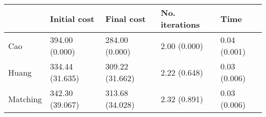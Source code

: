 \begin{tabular}{lllll}
\toprule
{} &     Initial cost &       Final cost & No. iterations &          Time \\
\midrule
Cao      &   394.00 (0.000) &   284.00 (0.000) &   2.00 (0.000) &  0.04 (0.001) \\
Huang    &  334.44 (31.635) &  309.22 (31.662) &   2.22 (0.648) &  0.03 (0.006) \\
Matching &  342.30 (39.067) &  313.68 (34.028) &   2.32 (0.891) &  0.03 (0.006) \\
\bottomrule
\end{tabular}
